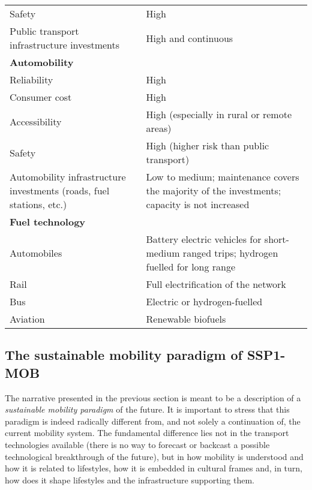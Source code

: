 \begin{table}
\begin{tabular}{p{5cm}p{9cm}}
Safety & High \\
Public transport infrastructure investments & High and continuous \\\addlinespace
\textbf{Automobility} &  \\
Reliability & High \\
Consumer cost & High \\
Accessibility & High (especially in rural or remote areas) \\
Safety & High (higher risk than public transport) \\
Automobility infrastructure investments (roads, fuel stations, etc.) & Low to medium; maintenance covers the majority of the investments; capacity is not increased \\\addlinespace
\textbf{Fuel technology} &  \\
Automobiles & Battery electric vehicles for short-medium ranged trips; hydrogen fuelled for long range \\
Rail & Full electrification of the network \\
Bus & Electric or hydrogen-fuelled \\
Aviation & Renewable biofuels \\ \bottomrule
\end{tabular}
\end{table}

\subsection{The sustainable mobility paradigm of SSP1-MOB}
\label{ss:results:ssp1-mob-paradigm}
The narrative presented in the previous section is meant to be a description of a \emph{sustainable mobility paradigm} of the future. It is important to stress that this paradigm is indeed radically different from, and not solely a continuation of, the current mobility system. The fundamental difference lies not in the transport technologies available (there is no way to forecast or backcast a possible technological breakthrough of the future), but in how mobility is understood and how it is related to lifestyles, how it is embedded in cultural frames and, in turn, how does it shape lifestyles and the infrastructure supporting them.

